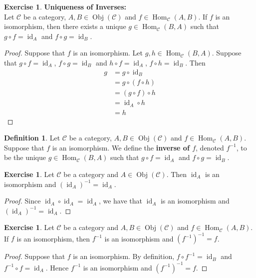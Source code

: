 \documentclass[12pt]{amsart}
\theoremstyle{definition}
\newtheorem{defn}[definition]{Definition}
\newtheorem{ex}[definition]{Exercise}
\newcommand{\MC}{\mathcal{C}}
\DeclareMathOperator{\id}{id}
\DeclareMathOperator{\Obj}{Obj}
\DeclareMathOperator{\Hom}{Hom}
\DeclareMathOperator*{\0}{\mbf{0}}
\DeclareMathOperator*{\1}{\mbf{1}}
\newcommand{\lex}[1]{\label{ex:#1}}
\newcommand{\ld}[1]{\label{defn:#1}}
\begin{document}
	\begin{ex} \lex{15003} \textbf{Uniqueness of Inverses:} \\
		Let $\MC$ be a category, $A,B \in \Obj(\MC)$ and $f \in \Hom_{\MC}(A, B)$. If $f$ is an isomorphism, then there exists a unique $g \in \Hom_{\MC}(B, A)$ such that $g \circ f = \id_A$ and $f \circ g = \id_B$.
	\end{ex}
	
	\begin{proof}
		Suppose that $f$ is an isomorphism. Let $g,h \in \Hom_{\MC}(B, A)$. Suppose that $g \circ f = \id_A$, $f \circ g = \id_B$ and $h \circ f = \id_A$, $f \circ h = \id_B$. Then 
		\begin{align*}
			g
			& = g \circ \id_{B} \\
			& = g \circ (f \circ h) \\
			& = (g \circ f) \circ  h \\
			& = \id_A \circ h \\
			& = h
		\end{align*}
	\end{proof}

	\begin{defn} \ld{15003.1}
		Let $\MC$ be a category, $A,B \in \Obj(\MC)$ and $f \in \Hom_{\MC}(A, B)$. Suppose that $f$ is an isomorphism. We define the \textbf{inverse of $f$}, denoted $f^{-1}$, to be the unique $g \in \Hom_{\MC}(B, A)$ such that $g \circ f = \id_A$ and $f \circ g = \id_B$.
	\end{defn}
	
	\begin{ex} \lex{15004}
		Let $\MC$ be a category and $A \in \Obj(\MC)$. Then $\id_A$ is an isomorphism and $(\id_A)^{-1} = \id_A$. 
	\end{ex}
	
	\begin{proof}
		Since $\id_A \circ \id_A = \id_A$, we have that $\id_A$ is an isomorphism and $(\id_A)^{-1} = \id_A$.
	\end{proof}
	
	\begin{ex} \lex{15005}
		Let $\MC$ be a category and $A, B \in \Obj(\MC)$ and $f \in \Hom_{\MC}(A,B)$. If $f$ is an isomorphism, then $f^{-1}$ is an isomorphism and $(f^{-1})^{-1} = f$.
	\end{ex}
	
	\begin{proof}
		Suppose that $f$ is an isomorphism. By definition, $f \circ f^{-1} = \id_{B}$ and $f^{-1} \circ f = \id_A$. Hence $f^{-1}$ is an isomorphism and $(f^{-1})^{-1} = f$.
	\end{proof}
	
\end{document}
